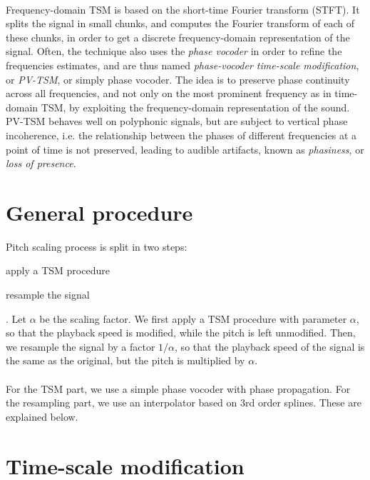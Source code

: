 \documentclass[letterpaper]{article}
\theoremstyle{definition}
\theoremstyle{remark}
\theoremstyle{plain}
\begin{document}
\paragraph{} Frequency-domain TSM is based on the short-time Fourier transform
(STFT). It splits the signal in small chunks, and computes the Fourier transform
of each of these chunks, in order to get a discrete frequency-domain
representation of the signal. Often, the technique also uses the \emph{phase
vocoder} in order to refine the frequencies estimates, and are thus named
\emph{phase-vocoder time-scale modification}, or \emph{PV-TSM}, or simply phase
vocoder. The idea is to preserve phase continuity across all frequencies, and
not only on the most prominent frequency as in time-domain TSM, by exploiting
the frequency-domain representation of the sound. PV-TSM behaves well on
polyphonic signals, but are subject to vertical phase incoherence, i.e. the
relationship between the phases of different frequencies at a point of time is
not preserved, leading to audible artifacts, known as \emph{phasiness}, or
\emph{loss of presence}.

\section{General procedure}
\label{sec:procedure}
Pitch scaling process is split in two steps: \begin{enumerate*}[label=\arabic*)]
\item apply a TSM procedure \item resample the signal\end{enumerate*}. Let
\(\alpha\) be the scaling factor. We first apply a TSM procedure with parameter
\(\alpha\), so that the playback speed is modified, while the pitch is left
unmodified. Then, we resample the signal by a factor \(1/\alpha\), so that the
playback speed of the signal is the same as the original, but the pitch is
multiplied by \(\alpha\).

\paragraph{}
For the TSM part, we use a simple phase vocoder with phase propagation. For the
resampling part, we use an interpolator based on 3rd order splines. These are
explained below.

\section{Time-scale modification}
\end{document}
